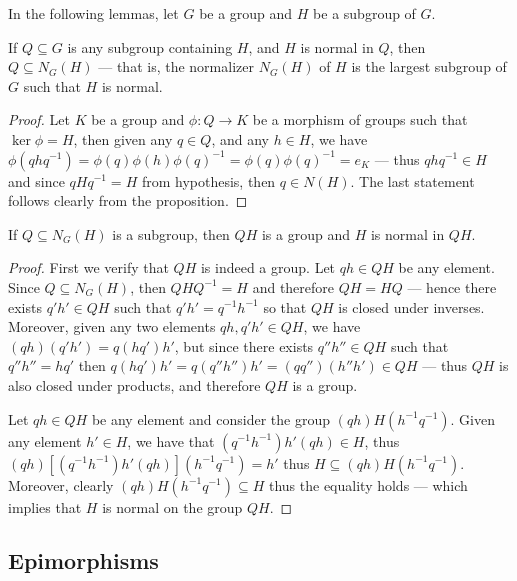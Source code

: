In the following lemmas, let \(G\) be a group and \(H\) be a subgroup of \(G\).

\begin{lemma}
If \(Q \subseteq G\) is any subgroup containing \(H\), and \(H\) is normal in
\(Q\), then \(Q \subseteq N_G(H)\) --- that is, the normalizer \(N_G(H)\) of
\(H\) is the largest subgroup of \(G\) such that \(H\) is normal.
\end{lemma}

\begin{proof}
Let \(K\) be a group and \(\phi: Q \to K\) be a morphism of groups such that
\(\ker \phi = H\), then given any \(q \in Q\), and any \(h \in H\), we have
\(\phi(q h q^{-1}) = \phi(q) \phi(h) \phi(q)^{-1} = \phi(q) \phi(q)^{-1} = e_K\)
--- thus \(q h q^{-1} \in H\) and since \(q H q^{-1} = H\) from hypothesis, then
\(q \in N(H)\). The last statement follows clearly from the proposition.
\end{proof}

\begin{lemma}
If \(Q \subseteq N_G(H)\) is a subgroup, then \(Q H\) is a group and \(H\) is
normal in \(Q H\).
\end{lemma}

\begin{proof}
First we verify that \(Q H\) is indeed a group. Let \(q h \in Q H\) be any
element. Since \(Q \subseteq N_G(H)\), then \(Q H Q^{-1} = H\) and therefore
\(Q H = H Q\) --- hence there exists \(q' h' \in Q H\) such that
\(q' h' = q^{-1} h^{-1}\) so that \(Q H\) is closed under inverses. Moreover,
given any two elements \(q h, q' h' \in Q H\), we have
\((q h)(q' h') = q (h q') h'\), but since there exists \(q'' h'' \in Q H\) such
that \(q'' h'' = h q'\) then
\(q(h q') h' = q (q'' h'') h' = (q q'') (h'' h') \in Q H\) --- thus \(Q H\) is
also closed under products, and therefore \(Q H\) is a group.

Let \(q h \in Q H\) be any element and consider the group
\((q h) H (h^{-1} q^{-1})\). Given any element \(h' \in H\), we have that
\((q^{-1} h^{-1}) h' (q h) \in H\), thus
\((q h) [(q^{-1} h^{-1}) h' (q h)] (h^{-1} q ^{-1}) = h'\) thus
\(H \subseteq (q h) H (h^{-1} q^{-1})\). Moreover, clearly
\((q h) H (h^{-1} q^{-1}) \subseteq H\) thus the equality holds --- which
implies that \(H\) is normal on the group \(Q H\).
\end{proof}

\subsection{Epimorphisms}

